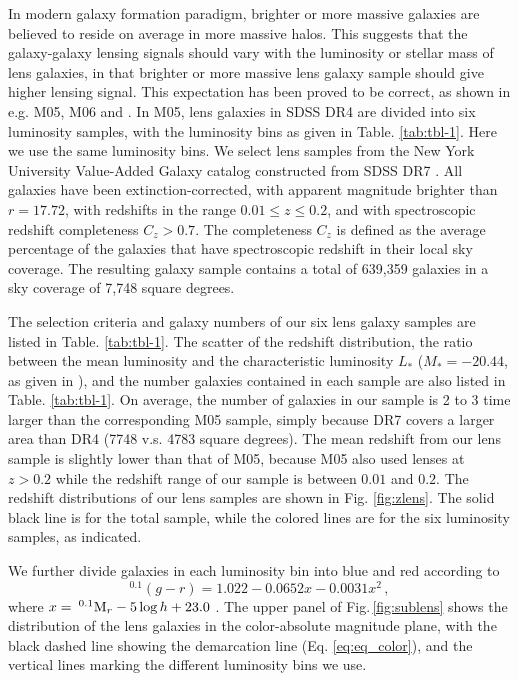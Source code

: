 \documentclass[apj]{emulateapj}
\newcommand{\rmag}{\>^{0.1}{\rm M}_r-5\log h}
\begin{document}
In modern galaxy formation paradigm, brighter or more massive galaxies
are believed to reside on average in more massive halos. This suggests
that the galaxy-galaxy lensing signals should vary with the 
luminosity or stellar mass of lens galaxies, in that 
brighter or more massive lens galaxy sample should give higher 
lensing signal. This expectation has been proved to be correct, as shown 
in e.g. M05, M06 and \citet{Sheldon2009}. In M05, lens galaxies 
in SDSS DR4 are divided into six luminosity samples, with the  
luminosity bins as given in Table. \ref{tab:tbl-1}. Here we use 
the same luminosity bins. We select lens samples from the 
New York University Value-Added Galaxy catalog 
\citep[NYU-VAGC]{Blanton2005} constructed from SDSS DR7 
\citep{Abazajian2009}.  All galaxies have been
extinction-corrected,  with apparent magnitude brighter 
than $r=17.72$, with redshifts in the range $0.01\leq z\leq 0.2$, 
and with spectroscopic redshift completeness $C_z>0.7$. 
The completeness $C_z$ is defined as the average percentage of 
the galaxies that have spectroscopic redshift in their local sky 
coverage. The resulting galaxy sample contains a total
of 639,359 galaxies in a sky coverage of 7,748 square degrees.

The selection criteria and galaxy numbers of our six lens
galaxy samples are listed in Table. \ref{tab:tbl-1}. The scatter of
the redshift distribution, the ratio between the mean luminosity
and the characteristic luminosity $L_*$ ($M_*=-20.44$, as 
given in \cite{Blanton2003}),  and the number galaxies contained 
in each sample are also listed in Table. \ref{tab:tbl-1}. 
On average, the number of galaxies in our sample is 2 to 3
time larger than the corresponding M05 sample, simply 
because DR7 covers a larger area than DR4 (7748 v.s. 
4783 square degrees). The mean redshift from our lens sample 
is slightly lower than that of M05, because M05 also used
lenses at $z>0.2$ while the redshift range of our sample is 
between $0.01$ and $0.2$. The redshift distributions of our lens 
samples are shown in Fig. \ref{fig:zlens}. The solid black line 
is for the total sample, while the colored lines are for 
the six luminosity samples, as indicated.

We further divide galaxies in each luminosity bin into blue and red
according to 
\begin{equation}
^{0.1}(g-r)=1.022-0.0652x-0.0031x^2 \,,
\label{eq:eq_color}
\end{equation}
where $x=\rmag + 23.0$ \citep{Yang2008}. The upper panel of 
Fig.\,\ref{fig:sublens} shows the distribution of the lens galaxies 
in the color-absolute magnitude plane, with the black dashed line 
showing the demarcation line (Eq. \ref{eq:eq_color}), and
the vertical lines marking the different luminosity bins we use.
\end{document}
